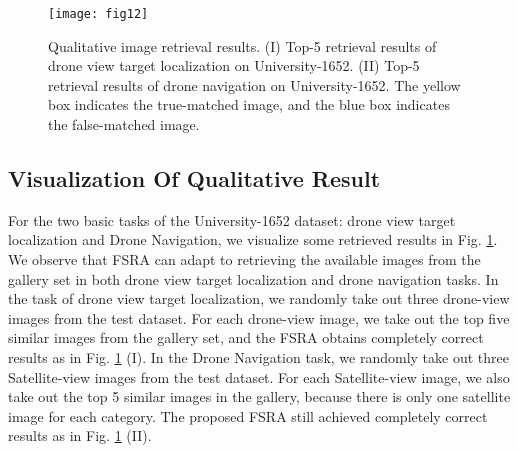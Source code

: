 \documentclass[lettersize,journal]{IEEEtran}
\begin{document}
\begin{figure}[!t]
\centering
\texttt{[image: fig12]}
\caption{Qualitative image retrieval results. (I) Top-5 retrieval results of drone view target localization on University-1652. (II) Top-5 retrieval results of drone navigation on University-1652. The yellow box indicates the true-matched image, and the blue box indicates the false-matched image.}
\label{fig_12}
\end{figure}


\subsection{Visualization Of Qualitative Result}
For the two basic tasks of the University-1652 dataset: drone view target localization and Drone Navigation, we visualize some retrieved results in Fig. \ref{fig_12}. We observe that FSRA can adapt to retrieving the available images from the gallery set in both drone view target localization and drone navigation tasks. In the task of drone view target localization, we randomly take out three drone-view images from the test dataset. For each drone-view image, we take out the top five similar images from the gallery set, and the FSRA obtains completely correct results as in Fig. \ref{fig_12} (I). In the Drone Navigation task, we randomly take out three Satellite-view images from the test dataset. For each Satellite-view image, we also take out the top 5 similar images in the gallery, because there is only one satellite image for each category. The proposed FSRA still achieved completely correct results as in Fig. \ref{fig_12} (II). 
\end{document}
